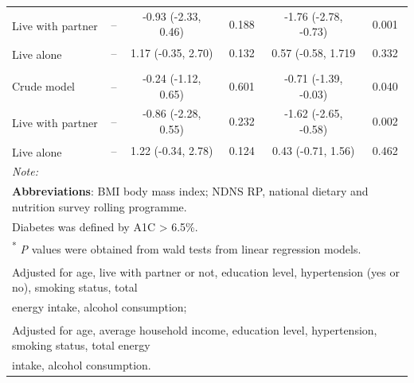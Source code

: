 \begin{table}[H]
\begin{tabular}[t]{lccccc}
		\hspace{1em}\hspace{1em}Live with partner\textsuperscript{\ddag} & -- & -0.93 (-2.33, 0.46) & 0.188 & -1.76 (-2.78, -0.73) & 0.001\\
		\hspace{1em}\hspace{1em}Live alone\textsuperscript{\ddag} & -- & 1.17 (-0.35, 2.70) & 0.132 & 0.57 (-0.58, 1.719 & 0.332\\
		\addlinespace[0.3em]
		\multicolumn{6}{l}{\hspace{1em}\textbf{BMI in non-diabetics}}\\
		\hspace{1em}\hspace{1em}Crude model & -- & -0.24 (-1.12, 0.65) & 0.601 & -0.71 (-1.39, -0.03) & 0.040\\
		\hspace{1em}\hspace{1em}Live with partner\textsuperscript{\ddag} & -- & -0.86 (-2.28, 0.55) & 0.232 & -1.62 (-2.65, -0.58) & 0.002\\
		\hspace{1em}\hspace{1em}Live alone\textsuperscript{\ddag} & -- & 1.22 (-0.34, 2.78) & 0.124 & 0.43 (-0.71, 1.56) & 0.462\\
		\bottomrule
		\multicolumn{6}{l}{{\scriptsize \textit{Note: }}}\\
		\multicolumn{6}{l}{{\scriptsize \textbf{Abbreviations}: BMI body mass index; NDNS RP, national dietary and nutrition survey rolling programme.}}\\
		\multicolumn{6}{l}{{\scriptsize Diabetes was defined by A1C > 6.5\%.}}\\
		\multicolumn{6}{l}{{\scriptsize \textsuperscript{*} \textit{P} values were obtained from wald tests from linear regression models.}}\\
		\multicolumn{6}{l}{{\scriptsize \textsuperscript{\dag} Adjusted for age, live with partner or not, education level, hypertension (yes or no), smoking status, total }}\\
		\multicolumn{6}{l}{{\scriptsize  energy intake, alcohol consumption;}}\\
		\multicolumn{6}{l}{{\scriptsize \textsuperscript{\ddag} Adjusted for age, average household income, education level, hypertension, smoking status, total energy}}\\ 
		\multicolumn{6}{l}{{\scriptsize  intake, alcohol consumption.}}\\
	\end{tabular}
\end{table}
\vspace{-0.3cm}

